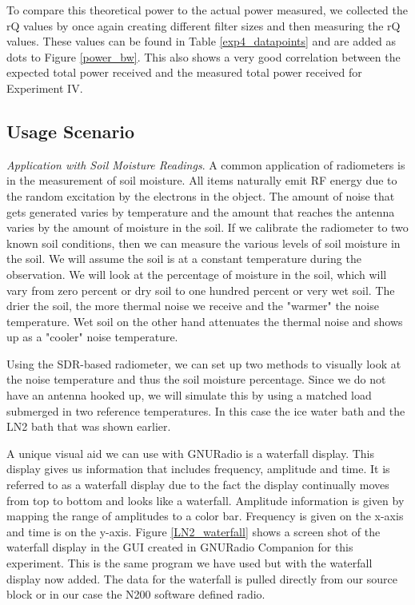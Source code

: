 {To compare this theoretical power to the actual power measured, we collected the rQ values by once again creating different filter sizes and then measuring the rQ values.  These values can be found in Table \ref{exp4_datapoints} and are added as dots to Figure \ref{power_bw}.  This also shows a very good correlation between the expected total power received and the measured total power received for Experiment IV.

\subsection{Usage Scenario}
\emph{Application with Soil Moisture Readings}.  A common application of radiometers is in the measurement of soil moisture.  All items naturally emit RF energy due to the random excitation by the electrons in the object.  The amount of noise that gets generated varies by temperature and the amount that reaches the antenna varies by the amount of moisture in the soil.  If we calibrate the radiometer to two known soil conditions, then we can measure the various levels of soil moisture in the soil.  We will assume the soil is at a constant temperature during the observation.  We will look at the percentage of moisture in the soil, which will vary from zero percent or dry soil to one hundred percent or very wet soil.  The drier the soil, the more thermal noise we receive and the "warmer" the noise temperature.  Wet soil on the other hand attenuates the thermal noise and shows up as a "cooler" noise temperature.  

Using the SDR-based radiometer, we can set up two methods to visually look at the noise temperature and thus the soil moisture percentage.  Since we do not have an antenna hooked up, we will simulate this by using a matched load submerged in two reference temperatures.  In this case the ice water bath and the LN2 bath that was shown earlier.  

A unique visual aid we can use with GNURadio is a waterfall display.  This display gives us information that includes frequency, amplitude and time.  It is referred to as a waterfall display due to the fact the display continually moves from top to bottom and looks like a waterfall.  Amplitude information is given by mapping the range of amplitudes to a color bar.  Frequency is given on the x-axis and time is on the y-axis.  Figure \ref{LN2_waterfall} shows a screen shot of the waterfall display in the GUI created in GNURadio Companion for this experiment.  This is the same program we have used but with the waterfall display now added.  The data for the waterfall is pulled directly from our source block or in our case the N200 software defined radio.

}
